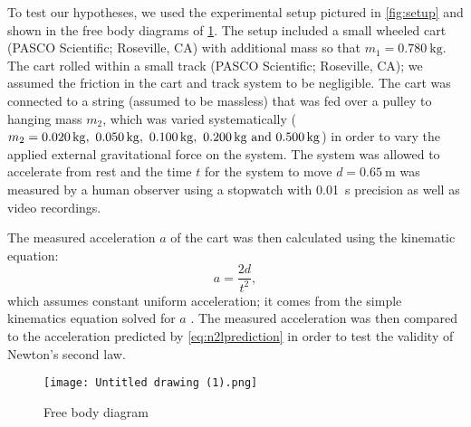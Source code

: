 ﻿\documentclass[reprint,amsmath,amssymb,aps,twoside]{revtex4-2}
\begin{document}
To test our hypotheses, we used the experimental setup pictured in \cref{fig:setup} and shown in the free body diagrams of \cref{fig:freebody}.  The setup included a small wheeled cart (PASCO Scientific; Roseville, CA) with additional mass so that $m_1=\qty{0.780}{\kilo\gram}$. The cart rolled within a small track (PASCO Scientific; Roseville, CA); we assumed the friction in the cart and track system to be negligible. The cart was connected to a string (assumed to be massless) that was fed over a pulley to hanging mass $m_2$, which was varied systematically ($m_2=\qtylist{0.020;0.050;0.100;0.200;0.500}{\kilo\gram}$)  in order to vary the applied external gravitational force on the system. The system was allowed to accelerate from rest and the time $t$ for the system to move $d=\qty{0.65}{\meter}$ was measured by a human observer using a stopwatch with \qty{0.01}{\second} precision as well as video recordings. 

The measured acceleration $a$ of the cart was then calculated using the kinematic equation:
\begin{equation}
a = \frac{2d}{t^2},
\label{eq:ameas}
\end{equation}
which assumes constant uniform acceleration; it comes from the simple kinematics equation solved for $a$ \cite{tipler}.  The measured acceleration was then compared to the acceleration predicted by \cref{eq:n2lprediction} in order to test the validity of Newton's second law. 



\begin{figure}
\begin{center}
\texttt{[image: Untitled drawing (1).png]}
\end{center}
\caption{\label{fig:freebody} Free body diagram}
\end{figure}
\end{document}
